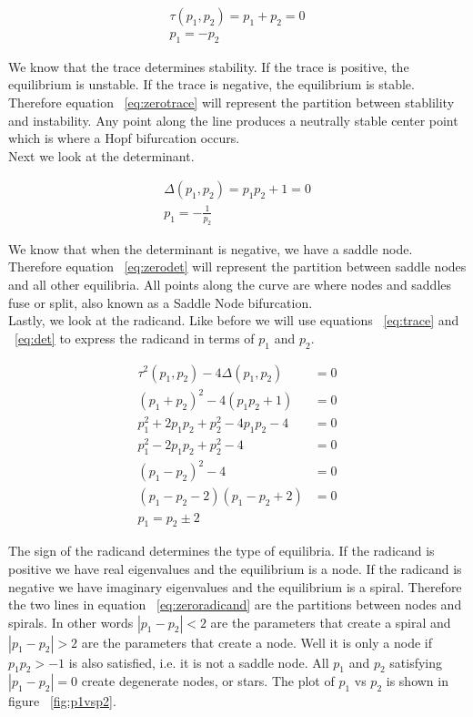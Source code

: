 \documentclass{article}
\begin{document}
\begin{gather}
    \tau(p_1,p_2) = p_1+p_2 = 0 \nonumber \\
    p_1 = -p_2 \label{eq:zerotrace}
\end{gather}

\noindent We know that the trace determines stability. If the trace is 
positive, the equilibrium is unstable. If the trace is negative, the equilibrium
is stable. Therefore equation ~\ref{eq:zerotrace} will represent the partition
between stablility and instability. Any point along the line produces a
neutrally stable center point which is where a Hopf bifurcation occurs. \\

\noindent Next we look at the determinant. 

\begin{gather}
    \Delta(p_1,p_2) = p_1p_2+1 = 0 \nonumber \\
    p_1=-\frac{1}{p_2} \label{eq:zerodet}
\end{gather}

\noindent We know that when the determinant is negative, we have a saddle
node. Therefore equation ~\ref{eq:zerodet} will represent the partition between
saddle nodes and all other equilibria. All points along the curve are where
nodes and saddles fuse or split, also known as a Saddle Node bifurcation. \\


\noindent Lastly, we look at the radicand. Like before we will use equations
~\ref{eq:trace} and ~\ref{eq:det} to express the radicand in terms of $p_1$ and
$p_2$.

\begin{align}
    \tau^2(p_1,p_2) - 4\Delta(p_1,p_2) &=0 \nonumber \\
    (p_1+p_2)^2-4(p_1p_2+1) &=0 \nonumber \\
    p_1^2+2p_1p_2+p_2^2-4p_1p_2-4 &=0 \nonumber \\
    p_1^2-2p_1p_2+p_2^2-4 &=0 \nonumber \\
    (p_1-p_2)^2-4 &=0 \nonumber \\
    (p_1-p_2-2)(p_1-p_2+2) &=0 \nonumber \\
    p_1 = p_2 \pm 2 \label{eq:zeroradicand}
\end{align}

\noindent The sign of the radicand determines the type of equilibria. If the
radicand is positive we have real eigenvalues and the equilibrium is a node. If
the radicand is negative we have imaginary eigenvalues and the equilibrium is a
spiral. Therefore the two lines in equation ~\ref{eq:zeroradicand} are the
partitions between nodes and spirals. In other words $|p_1-p_2| < 2$ are
the parameters that create a spiral and $|p_1-p_2| > 2$ are the parameters that
create a node. Well it is only a node if $p_1p_2 >-1$ is also satisfied, i.e. it
is not a saddle node. All
$p_1$ and $p_2$ satisfying $|p_1-p_2|=0$ create degenerate nodes, or stars. The
plot of $p_1$ vs $p_2$ is shown in figure ~\ref{fig:p1vsp2}.\\
\end{document}
